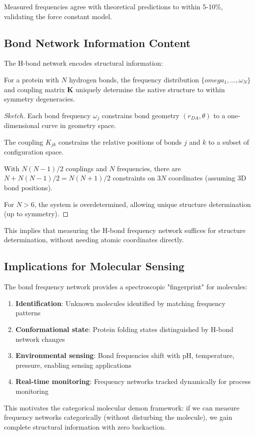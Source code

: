 Measured frequencies agree with theoretical predictions to within 5-10\%, validating the force constant model.

\subsection{Bond Network Information Content}

The H-bond network encodes structural information:

\begin{proposition}
For a protein with $N$ hydrogen bonds, the frequency distribution $\{omega_1, ..., \omega_N\}$ and coupling matrix $\mathbf{K}$ uniquely determine the native structure to within symmetry degeneracies.
\end{proposition}

\begin{proof}[Sketch]
Each bond frequency $\omega_j$ constrains bond geometry $(r_{DA}, \theta)$ to a one-dimensional curve in geometry space.

The coupling $K_{jk}$ constrains the relative positions of bonds $j$ and $k$ to a subset of configuration space.

With $N(N-1)/2$ couplings and $N$ frequencies, there are $N + N(N-1)/2 = N(N+1)/2$ constraints on $3N$ coordinates (assuming 3D bond positions).

For $N > 6$, the system is overdetermined, allowing unique structure determination (up to symmetry).
\end{proof}

This implies that measuring the H-bond frequency network suffices for structure determination, without needing atomic coordinates directly.

\subsection{Implications for Molecular Sensing}

The bond frequency network provides a spectroscopic "fingerprint" for molecules:

\begin{enumerate}
\item \textbf{Identification}: Unknown molecules identified by matching frequency patterns

\item \textbf{Conformational state}: Protein folding states distinguished by H-bond network changes

\item \textbf{Environmental sensing}: Bond frequencies shift with pH, temperature, pressure, enabling sensing applications

\item \textbf{Real-time monitoring}: Frequency networks tracked dynamically for process monitoring
\end{enumerate}

This motivates the categorical molecular demon framework: if we can measure frequency networks categorically (without disturbing the molecule), we gain complete structural information with zero backaction.
